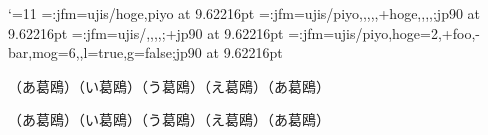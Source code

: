 
\catcode`\@=11
\jfont \testA=\ltj@stdmcfont:jfm=ujis/hoge,piyo at 9.62216pt
\jfont \testB=\ltj@stdmcfont:jfm=ujis/{piyo,,,,,+hoge,,,,};jp90 at 9.62216pt
\jfont \testC=\ltj@stdgtfont:jfm=ujis/,,,,;+jp90 at 9.62216pt
\jfont \testE=\ltj@stdmcfont:jfm=ujis/piyo,hoge=2,+foo,-bar,mog=6,,l=true,g=false;jp90 at 9.62216pt



{\testA （あ葛鴎）}{\testB （い葛鴎）}{\testC （う葛鴎）}（え葛鴎）{\tengt（あ葛鴎）}\par

{\testA （あ葛鴎）}{\testB （い葛鴎）}{\testC （う葛鴎）}（え葛鴎）{\tengt（あ葛鴎）}\par

\bye
